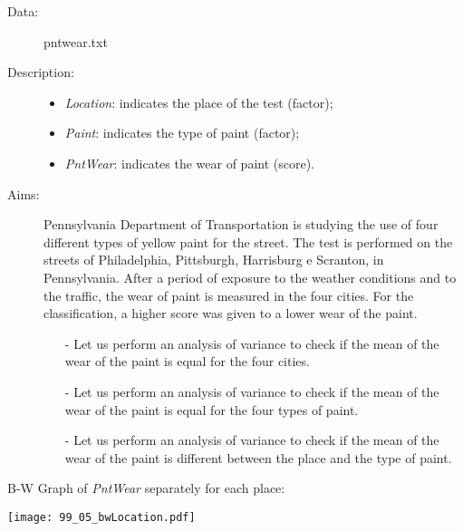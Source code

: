 \begin{frame}
  \begin{description}
    \item[Data: ]pntwear.txt \\ 
    \item[Description: ]
      \begin{footnotesize}
        \begin{itemize}
          \item \textit{Location}: indicates the place of the test (factor);
          \item \textit{Paint}: indicates the type of paint (factor);
          \item \textit{PntWear}: indicates the wear of paint (score).
        \end{itemize}
      \end{footnotesize}
    \item[Aims: ]
      \begin{footnotesize}
        Pennsylvania Department of Transportation is studying the use of four different types of yellow paint for the street. The test is performed on the streets of Philadelphia, Pittsburgh, Harrisburg e Scranton, in Pennsylvania. After a period of exposure to the weather conditions and to the  traffic, the wear of paint is measured in the four cities. For the classification, a higher score was given to a lower wear of the paint. 
      \begin{itemize}
          \item[-] Let us perform an analysis of variance to check if the mean of the wear of the paint is equal for the four cities. 
          \item[-] Let us perform an analysis of variance to check if the mean of the wear of the paint is equal for the four types of paint. 
          \item[-] Let us perform an analysis of variance to check if the mean of the wear of the paint is different between the place and the type of paint.
        \end{itemize}
      \end{footnotesize}
  \end{description}
\end{frame}

\begin{frame}
  B-W Graph of \textit{PntWear} separately for each place:\\
  \begin{center}
    \texttt{[image: 99\_05\_bwLocation.pdf]}
  \end{center}
\end{frame}

